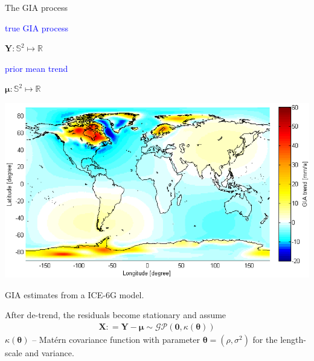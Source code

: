 \documentclass{beamer}
\begin{document}
\begin{frame}{The GIA process}

\vspace{0.5cm}
\begin{minipage}[c]{0.4\textwidth}
\textcolor{blue}{true GIA process} 

$\bm{Y}: \mathbb{S}^2 \mapsto \mathbb{R}$

\vspace{0.5cm}
\textcolor{blue}{prior mean trend}

$\bm{\mu}: \mathbb{S}^2 \mapsto \mathbb{R}$
\end{minipage}%
\begin{minipage}[c]{0.55\textwidth}
\centering
\includegraphics[width = \textwidth, clip]{images/ice6g}

\tiny{GIA estimates from a ICE-6G model.}
\end{minipage}

\vspace{0.3cm}
After de-trend, the residuals become stationary and assume
\begin{align}\label{eq:GIAresid}
 \bm{X}: = \bm{Y} - \bm{\mu} \sim \mathcal{GP}(\bm{0}, \kappa(\bm{\theta}))
\end{align}
$\kappa(\bm{\theta})$ -- Mat{\'e}rn covariance function with parameter $\bm{\theta} = (\rho, \sigma^2)$ for the length-scale and variance.

\end{frame}
\end{document}
